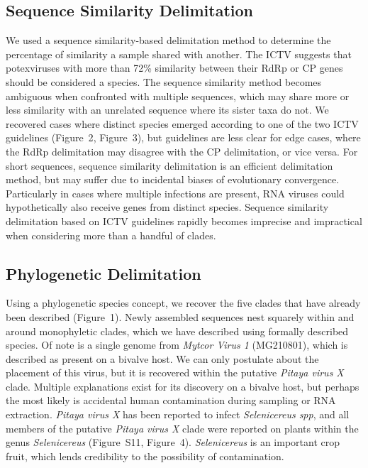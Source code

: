 \documentclass[fleqn,10pt,lineno]{wlpeerj}
\begin{document}
{\subsection*{Sequence Similarity Delimitation}
We used a sequence similarity-based delimitation method to determine the percentage of similarity a sample shared with another.
The ICTV suggests that potexviruses with more than 72\% similarity between their RdRp or CP genes should be considered a species.
The sequence similarity method becomes ambiguous when confronted with multiple sequences, which may share more or less similarity with an unrelated sequence where its sister taxa do not. 
We recovered cases where distinct species emerged according to one of the two ICTV guidelines ({Figure~2}, {Figure~3}), but guidelines are less clear for edge cases, where the RdRp delimitation may disagree with the CP delimitation, or vice versa.
For short sequences, sequence similarity delimitation is an efficient delimitation method, but may suffer due to incidental biases of evolutionary convergence.
Particularly in cases where multiple infections are present, RNA viruses could hypothetically also receive genes from distinct species.
Sequence similarity delimitation based on ICTV guidelines rapidly becomes imprecise and impractical when considering more than a handful of clades.

\subsection*{Phylogenetic Delimitation}
Using a phylogenetic species concept, we recover the five clades that have already been described ({Figure~1}).
Newly assembled sequences nest squarely within and around monophyletic clades, which we have described using formally described species. 
Of note is a single genome from \textit{Mytcor Virus 1} (MG210801), which is described as present on a bivalve host. 
We can only postulate about the placement of this virus, but it is recovered within the putative \textit{Pitaya virus X} clade.
Multiple explanations exist for its discovery on a bivalve host, but perhaps the most likely is accidental human contamination during sampling or RNA extraction.
\textit{Pitaya virus X} has been reported to infect \textit{Selenicereus spp}, and all members of the putative \textit{Pitaya virus X} clade were reported on plants within the genus \textit{Selenicereus} ({Figure~S11}, {Figure~4}).
\textit{Selenicereus} is an important crop fruit, which lends credibility to the possibility of contamination. 


}
\end{document}
